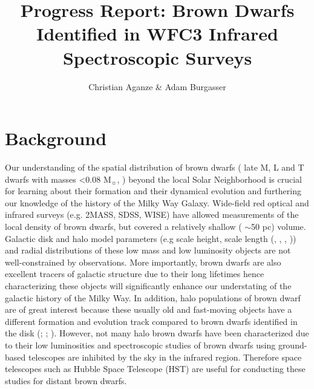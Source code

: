 \documentclass[preprint]{aastex}
\title{Progress Report: Brown Dwarfs Identified in WFC3 Infrared Spectroscopic Surveys}
\author{Christian Aganze \& Adam Burgasser}
\affil{Center for Astrophysics and Space Science, University of California San Diego }
\affil{9500 Gilman Dr, La Jolla, CA 92093}
\newcommand{\Msun}{M$_\sun$}
\begin{document}
\maketitle

\section{Background}

Our understanding of the spatial distribution of brown dwarfs ( late M, L and T dwarfs with masses \textless 0.08 \Msun , \citealt{2005ARA&A..43..195K} ) beyond the local Solar Neighborhood is crucial for learning about their formation and their dynamical evolution and furthering our knowledge of the history of the Milky Way Galaxy.  Wide-field red optical and infrared surveys (e.g. 2MASS, SDSS, WISE) have allowed measurements of the local density of brown dwarfs, but covered a relatively shallow ( $\sim$50 pc) volume. Galactic disk and halo model parameters (e.g scale height, scale length (\citealt{2009ApJ...695.1591P}, \citealt{2005ApJ...631L.159R}, \citealt{Konishi2014}, \citealt{Vledder2016})) and radial distributions of these low mass and low luminosity objects are not well-constrained by observations. More importantly, brown dwarfs are also excellent tracers of galactic structure due to their long lifetimes hence characterizing these objects will significantly enhance our understating of the galactic history of the Milky Way. In addition, halo populations of brown dwarf are of great interest because these usually old and fast-moving objects  have a different formation and evolution track compared to brown dwarfs identified in the disk (\citealt{2013ApJS..205....6M}; \citealt{2014MNRAS.437.1009P}; \citealt{0004-637X-787-2-126}). However, not many halo brown dwarfs have been characterized due to their low luminosities and spectroscopic studies of brown dwarfs using ground-based telescopes are inhibited by the sky in the infrared region. Therefore space telescopes such as Hubble Space Telescope (HST) are useful for conducting these studies for distant brown dwarfs. 
\end{document}
